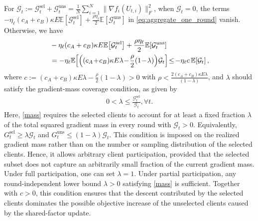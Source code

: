 \documentclass[lettersize,journal]{IEEEtran}
\begin{document}
	For $\mathcal{G}_t
	:=
	\mathcal{G}_t^{\mathrm{sel}}
	+\mathcal{G}_t^{\mathrm{uns}}
	=
	\frac{1}{N}
	\sum_{i=1}^{N}
	\|\nabla f_i(U_{t,i})\|_F^2$, when $\mathcal{G}_t=0$, the terms $-\eta_{\ell}(c_A+c_B)\kappa E
	\mathbb{E}\!\left[\mathcal{G}_t^{\mathrm{sel}}\right]
	+\frac{\rho\eta_{\ell}}{2}
	\mathbb{E}\!\left[\mathcal{G}_t^{\mathrm{uns}}\right]$ in
	\eqref{eq:aggregate_one_round} vanish. Otherwise, we have
	\begin{align}
		&-\eta_{\ell}(c_A+c_B)\kappa E
		\mathbb{E}\!\left[\mathcal{G}_t^{\mathrm{sel}}\right]
		+\frac{\rho\eta_{\ell}}{2}
		\mathbb{E}\!\left[\mathcal{G}_t^{\mathrm{uns}}\right]
		\label{eq:positive_descent_coefficient}\\
		&=
		-\eta_{\ell}
		\mathbb{E}\!\left[
		\left(
		(c_A\!+\!c_B)\kappa E\lambda
		\!-\!\frac{\rho}{2}(1\!-\!\lambda)
		\right)\!
		\mathcal{G}_t
		\right]
		\!\le\!
		-\eta_{\ell}c\,
		\mathbb{E}\!\left[\mathcal{G}_t\right], \notag
	\end{align}
	where $c:=
	(c_A+c_B)\kappa E\lambda
	-\frac{\rho}{2}(1-\lambda)>0$ with $\rho < \frac{2(c_A+c_B)\kappa E \lambda }{(1-\lambda)}$, and $\lambda$ should satisfy the gradient-mass coverage condition, as given by
	\begin{align} \label{mass}
		0< \lambda \leq \frac{\mathcal{G}_t^{\mathrm{sel}}}{\mathcal{G}_t}, \forall t.
	\end{align}  
Here, \eqref{mass} requires the selected clients to account for at least a fixed fraction $\lambda$ of the total squared gradient
mass in every round with $\mathcal{G}_t>0$. Equivalently,
$G_t^{\mathrm{sel}}\geq \lambda \mathcal{G}_t$ and
$G_t^{\mathrm{uns}}\leq (1-\lambda)\mathcal{G}_t$. This condition is
imposed on the realized gradient mass rather than on the
number or sampling distribution of the selected clients.
Hence, it allows arbitrary client participation, provided that
the selected subset does not capture an arbitrarily small
fraction of the current gradient mass. Under full
participation, one can set $\lambda=1$. Under partial
participation, any round-independent lower bound
$\lambda>0$ satisfying \eqref{mass} is sufficient. Together with
$c>0$, this condition ensures that the descent contributed by
the selected clients dominates the possible objective increase
of the unselected clients caused by the shared-factor update.
	
	
\end{document}
